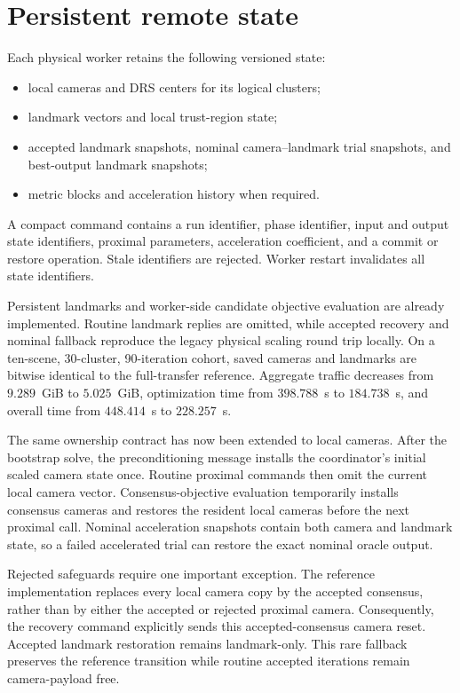 \section{Persistent remote state}

Each physical worker retains the following versioned state:
\begin{itemize}
  \item local cameras and DRS centers for its logical clusters;
  \item landmark vectors and local trust-region state;
  \item accepted landmark snapshots, nominal camera--landmark trial snapshots,
        and best-output landmark snapshots;
  \item metric blocks and acceleration history when required.
\end{itemize}
A compact command contains a run identifier, phase identifier, input and output
state identifiers, proximal parameters, acceleration coefficient, and a commit
or restore operation.  Stale identifiers are rejected.  Worker restart
invalidates all state identifiers.

Persistent landmarks and worker-side candidate objective evaluation are already
implemented.  Routine landmark replies are omitted, while accepted recovery and
nominal fallback reproduce the legacy physical scaling round trip locally.  On
a ten-scene, 30-cluster, 90-iteration cohort, saved cameras and landmarks are
bitwise identical to the full-transfer reference.  Aggregate traffic decreases
from $9.289$~GiB to $5.025$~GiB, optimization time from $398.788$~s to
$184.738$~s, and overall time from $448.414$~s to $228.257$~s.

The same ownership contract has now been extended to local cameras.  After the
bootstrap solve, the preconditioning message installs the coordinator's initial
scaled camera state once.  Routine proximal commands then omit the current local
camera vector.  Consensus-objective evaluation temporarily installs consensus
cameras and restores the resident local cameras before the next proximal call.
Nominal acceleration snapshots contain both camera and landmark state, so a
failed accelerated trial can restore the exact nominal oracle output.

Rejected safeguards require one important exception.  The reference
implementation replaces every local camera copy by the accepted consensus,
rather than by either the accepted or rejected proximal camera.  Consequently,
the recovery command explicitly sends this accepted-consensus camera reset.
Accepted landmark restoration remains landmark-only.  This rare fallback
preserves the reference transition while routine accepted iterations remain
camera-payload free.


